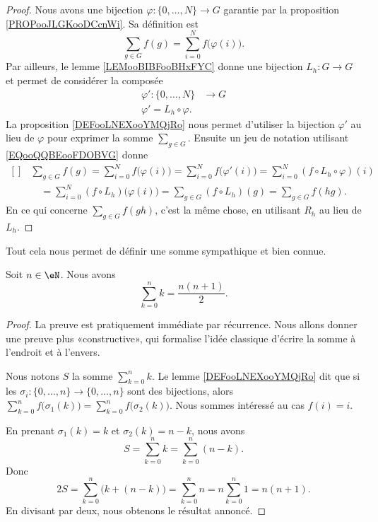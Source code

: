 \begin{proof}
	Nous avons une bijection \( \varphi\colon \{ 0,\ldots,  N \}\to G\) garantie par la proposition \ref{PROPooJLGKooDCcnWi}. Sa définition est
	\begin{equation}
		\sum_{g\in G}f(g)=\sum_{i=0}^Nf\big( \varphi(i) \big).
	\end{equation}
	Par ailleurs, le lemme \ref{LEMooBIBFooBHxFYC} donne une bijection \( L_h\colon G\to G\) et permet de considérer la composée
	\begin{equation}
		\begin{aligned}
			\varphi'\colon \{ 0,\ldots,  N \} & \to G \\
			\varphi'=L_h\circ \varphi.
		\end{aligned}
	\end{equation}
	La proposition \ref{DEFooLNEXooYMQjRo} nous permet d'utiliser la bijection \( \varphi'\) au lieu de \( \varphi\) pour exprimer la somme \( \sum_{g\in G}\). Ensuite un jeu de notation utilisant \eqref{EQooQQBEooFDOBVG} donne
	\begin{equation}
		\begin{aligned}[]
			 & \sum_{g\in G}f(g)=\sum_{i=0}^Nf\big( \varphi(i) \big)=\sum_{i=0}^Nf\big( \varphi'(i) \big)=\sum_{i=0}^N(f\circ L_h\circ \varphi)(i) \\
			 & \quad=\sum_{i=0}^N(f\circ L_h)\big( \varphi(i) \big)=\sum_{g\in G}(f\circ L_h)(g)=\sum_{g\in G}f(hg).
		\end{aligned}
	\end{equation}
	En ce qui concerne \( \sum_{g\in G}f(gh)\), c'est la même chose, en utilisant \( R_h\) au lieu de \( L_h\).
\end{proof}

Tout cela nous permet de définir une somme sympathique et bien connue.
\begin{lemma}
	Soit \( n\in \eN\). Nous avons
	\begin{equation}
		\sum_{k=0}^nk=\frac{ n(n+1) }{ 2 }.
	\end{equation}
\end{lemma}

\begin{proof}
	La preuve est pratiquement immédiate par récurrence. Nous allons donner une preuve plus «constructive», qui formalise l'idée classique d'écrire la somme à l'endroit et à l'envers.


	Nous notons \( S\) la somme \( \sum_{k=0}^nk\). Le lemme \ref{DEFooLNEXooYMQjRo} dit que si les \( \sigma_i\colon \{ 0,\ldots, n \}\to \{ 0,\ldots, n \}\) sont des bijections, alors \( \sum_{k=0}^nf\big( \sigma_1(k) \big)=\sum_{k=0}^nf\big( \sigma_2(k) \big)\). Nous sommes intéressé au cas \( f(i)=i\).

	En prenant \( \sigma_1(k)=k\) et \( \sigma_2(k)=n-k\), nous avons
	\begin{equation}
		S=\sum_{k=0}^nk=\sum_{k=0}^n(n-k).
	\end{equation}
	Donc
	\begin{equation}
		2S=\sum_{k=0}^n\big( k+(n-k) \big)=\sum_{k=0}^nn=n\sum_{k=0}^n1=n(n+1).
	\end{equation}
	En divisant par deux, nous obtenons le résultat annoncé.
\end{proof}


